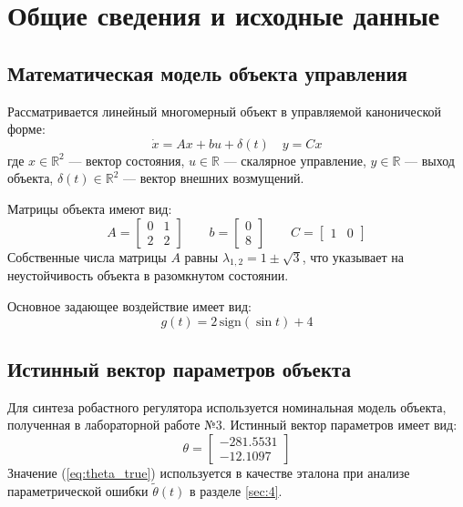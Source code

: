 \documentclass[a4paper,12pt]{article}
\begin{document}
	\newpage
	\tableofcontents
	
	
	\newpage
	\section{Общие сведения и исходные данные}
	
	\subsection{Математическая модель объекта управления}
	Рассматривается линейный многомерный объект в управляемой канонической форме:
	\begin{equation}
		\dot{x} = Ax + bu + \delta(t) \quad y = Cx
		\label{eq:o}
	\end{equation}
	где $x \in \mathbb{R}^2$ --- вектор состояния, $u \in \mathbb{R}$ --- скалярное управление, $y \in \mathbb{R}$ --- выход объекта, $\delta(t) \in \mathbb{R}^2$ --- вектор внешних возмущений.
	
	Матрицы объекта имеют вид:
	\begin{equation}
		A = \begin{bmatrix} 0 & 1 \\ 2 & 2 \end{bmatrix} \qquad 
		b = \begin{bmatrix} 0 \\ 8 \end{bmatrix} \qquad 
		C = \begin{bmatrix} 1 & 0 \end{bmatrix}
	\end{equation}
	Собственные числа матрицы $A$ равны $\lambda_{1,2} = 1 \pm \sqrt{3}$, что указывает на неустойчивость объекта в разомкнутом состоянии.
	
	Основное задающее воздействие имеет вид:
	\begin{equation}
		g(t) = 2\,\text{sign}(\sin t) + 4
	\end{equation}
	
	\subsection{Истинный вектор параметров объекта}
	Для синтеза робастного регулятора используется номинальная модель объекта, полученная в лабораторной работе №3. Истинный вектор параметров имеет вид:
	\begin{equation}
		\theta = \begin{bmatrix} -281.5531 \\ -12.1097 \end{bmatrix}
		\label{eq:theta_true}
	\end{equation}
	Значение (\ref{eq:theta_true}) используется в качестве эталона при анализе параметрической ошибки $\tilde{\theta}(t)$ в разделе \ref{sec:4}.
	
\end{document}
